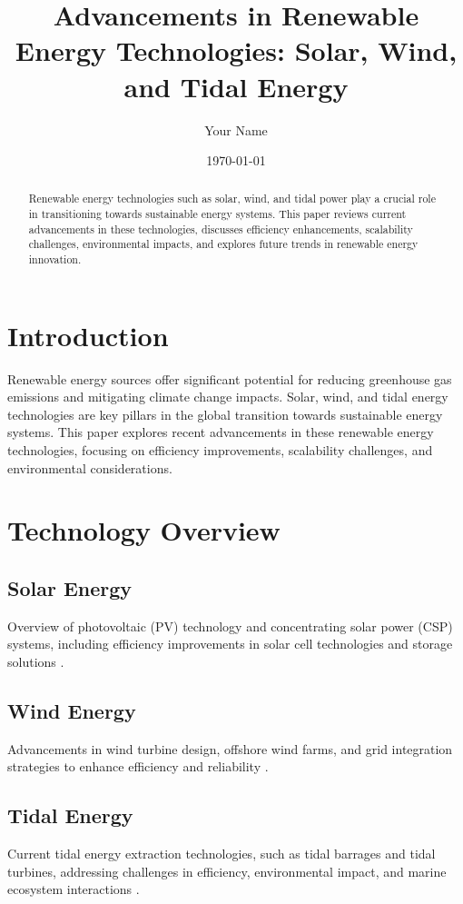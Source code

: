 \documentclass[12pt]{article}
\title{Advancements in Renewable Energy Technologies: Solar, Wind, and Tidal Energy}
\author{Your Name}
\date{\today}
\begin{document}
\maketitle

\begin{abstract}
Renewable energy technologies such as solar, wind, and tidal power play a crucial role in transitioning towards sustainable energy systems. This paper reviews current advancements in these technologies, discusses efficiency enhancements, scalability challenges, environmental impacts, and explores future trends in renewable energy innovation.
\end{abstract}

\section{Introduction}
Renewable energy sources offer significant potential for reducing greenhouse gas emissions and mitigating climate change impacts. Solar, wind, and tidal energy technologies are key pillars in the global transition towards sustainable energy systems. This paper explores recent advancements in these renewable energy technologies, focusing on efficiency improvements, scalability challenges, and environmental considerations.

\section{Technology Overview}
\subsection{Solar Energy}
Overview of photovoltaic (PV) technology and concentrating solar power (CSP) systems, including efficiency improvements in solar cell technologies and storage solutions \citep{green2018solar, poluzzi2018concentrating}.

\subsection{Wind Energy}
Advancements in wind turbine design, offshore wind farms, and grid integration strategies to enhance efficiency and reliability \citep{barthelmie2010future, chaudhry2018wind}.

\subsection{Tidal Energy}
Current tidal energy extraction technologies, such as tidal barrages and tidal turbines, addressing challenges in efficiency, environmental impact, and marine ecosystem interactions \citep{bahaj2007tidal, johnson2018tidal}.
\end{document}
